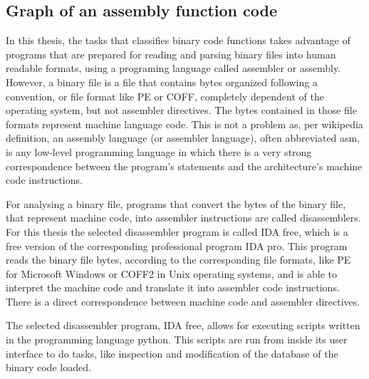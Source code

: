 \begin{appendices}


\section{Graph of an assembly function code}

In this thesis, the tasks that classifies binary code functions takes advantage of programs that are prepared for reading and parsing binary files into human readable formats, using a programing language called assembler or assembly. However, a binary file is a file that contains bytes organized following a convention, or file format like PE or COFF, completely dependent of the operating system, but not assembler directives. The bytes contained in those file formats represent machine language code. This is not a problem as, per wikipedia definition, an assembly language (or assembler language), often abbreviated asm, is any low-level programming language in which there is a very strong correspondence between the program's statements and the architecture's machine code instructions. 


For analysing a binary file, programs that convert the bytes of the binary file, that represent machine code, into assembler instructions are called disassemblers. For this thesis the selected disassembler program is called IDA free, which is a free version of the corresponding professional program IDA pro. This program reads the binary file bytes, according to the corresponding file formats, like PE for Microsoft Windows or COFF2 in Unix operating systems, and is able to interpret the machine code and translate it into assembler code instructions. There is a direct correspondence between machine code and assembler directives.

The selected disassembler program, IDA free, allows for executing scripts written in the programming language python. This scripts are run from inside its user interface to do tasks, like inspection and modification of the database of the binary code loaded.


\end{appendices}
